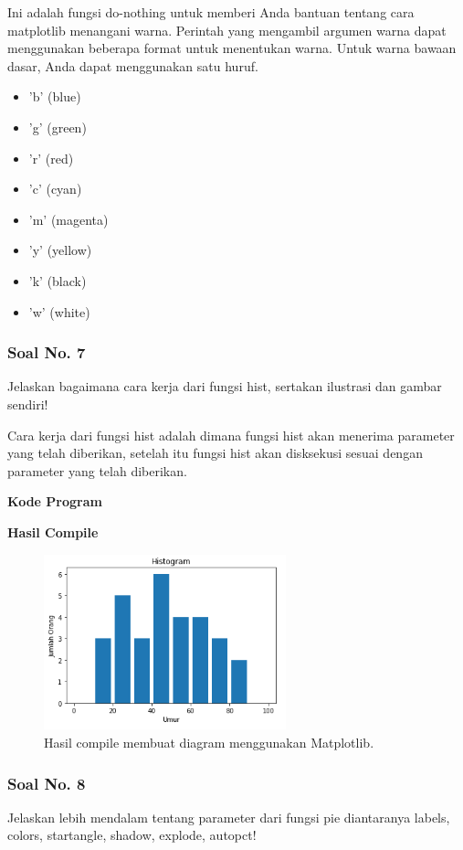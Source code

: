 Ini adalah fungsi do-nothing untuk memberi Anda bantuan tentang cara matplotlib menangani warna. Perintah yang mengambil argumen warna dapat menggunakan beberapa format untuk menentukan warna. Untuk warna bawaan dasar, Anda dapat menggunakan satu huruf.
\begin{itemize}
	\item 'b' (blue)
	\item 'g' (green)
	\item 'r' (red)
	\item 'c' (cyan)
	\item 'm' (magenta)
	\item 'y' (yellow)
	\item 'k' (black)
	\item 'w' (white)
\end{itemize}

\subsubsection{Soal No. 7}
\hfill \break
Jelaskan bagaimana cara kerja dari fungsi hist, sertakan ilustrasi dan gambar sendiri!

\hfill \break
Cara kerja dari fungsi hist adalah dimana fungsi hist akan menerima parameter yang telah diberikan, setelah itu fungsi hist akan disksekusi sesuai dengan parameter yang telah diberikan.

\hfill \break
\textbf{Kode Program}



\hfill \break
\textbf{Hasil Compile}

\begin{figure}[H]
	\includegraphics[width=7cm]{figures/6/1144124/7.png}
	\centering
	\caption{Hasil compile membuat diagram menggunakan Matplotlib.}
\end{figure}

\subsubsection{Soal No. 8}
\hfill \break
 Jelaskan lebih mendalam tentang parameter dari fungsi pie diantaranya labels, colors, startangle, shadow, explode, autopct!

